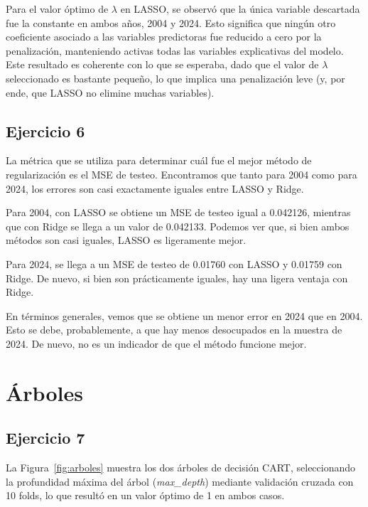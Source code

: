 \documentclass[12pt]{article}
\begin{document}
Para el valor óptimo de \(\lambda\) en LASSO, se observó que la única variable descartada fue la constante en ambos años, 2004 y 2024. Esto significa que ningún otro coeficiente asociado a las variables predictoras fue reducido a cero por la penalización, manteniendo activas todas las variables explicativas del modelo. Este resultado es coherente con lo que se esperaba, dado que el valor de \(\lambda\) seleccionado es bastante pequeño, lo que implica una penalización leve (y, por ende, que LASSO no elimine muchas variables).

\subsection*{Ejercicio 6}

La métrica que se utiliza para determinar cuál fue el mejor método de regularización es el MSE de testeo. Encontramos que tanto para 2004 como para 2024, los errores son casi exactamente iguales entre LASSO y Ridge.

Para 2004, con LASSO se obtiene un MSE de testeo igual a 0.042126, mientras que con Ridge se llega a un valor de 0.042133. Podemos ver que, si bien ambos métodos son casi iguales, LASSO es ligeramente mejor.

Para 2024, se llega a un MSE de testeo de 0.01760 con LASSO y 0.01759 con Ridge. De nuevo, si bien son prácticamente iguales, hay una ligera ventaja con Ridge.

En términos generales, vemos que se obtiene un menor error en 2024 que en 2004. Esto se debe, probablemente, a que hay menos desocupados en la muestra de 2024. De nuevo, no es un indicador de que el método funcione mejor.

\section{Árboles}
\subsection*{Ejercicio 7}

La Figura~\ref{fig:arboles} muestra los dos árboles de decisión CART, seleccionando la profundidad máxima del árbol (\textit{max\_depth}) mediante validación cruzada con 10 folds, lo que resultó en un valor óptimo de 1 en ambos casos.
\end{document}
